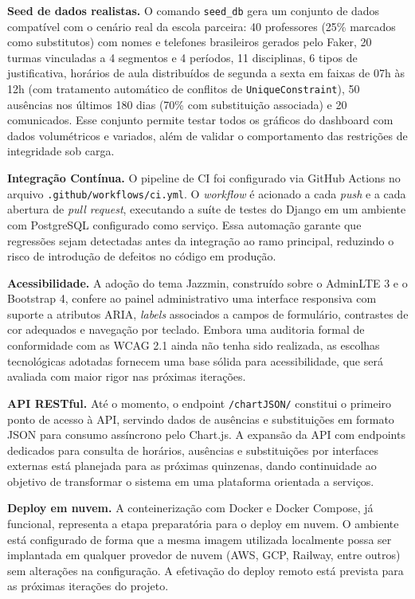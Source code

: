 \textbf{Seed de dados realistas.} O comando \texttt{seed\_db} gera um conjunto de dados compatível com o cenário real da escola parceira: 40 professores (25\% marcados como substitutos) com nomes e telefones brasileiros gerados pelo Faker, 20 turmas vinculadas a 4 segmentos e 4 períodos, 11 disciplinas, 6 tipos de justificativa, horários de aula distribuídos de segunda a sexta em faixas de 07h às 12h (com tratamento automático de conflitos de \texttt{UniqueConstraint}), 50 ausências nos últimos 180 dias (70\% com substituição associada) e 20 comunicados. Esse conjunto permite testar todos os gráficos do dashboard com dados volumétricos e variados, além de validar o comportamento das restrições de integridade sob carga.

\textbf{Integração Contínua.} O pipeline de CI foi configurado via GitHub Actions no arquivo \texttt{.github/workflows/ci.yml}. O \textit{workflow} é acionado a cada \textit{push} e a cada abertura de \textit{pull request}, executando a suíte de testes do Django em um ambiente com PostgreSQL configurado como serviço. Essa automação garante que regressões sejam detectadas antes da integração ao ramo principal, reduzindo o risco de introdução de defeitos no código em produção.

\textbf{Acessibilidade.} A adoção do tema Jazzmin, construído sobre o AdminLTE 3 e o Bootstrap 4, confere ao painel administrativo uma interface responsiva com suporte a atributos ARIA, \textit{labels} associados a campos de formulário, contrastes de cor adequados e navegação por teclado. Embora uma auditoria formal de conformidade com as WCAG 2.1 ainda não tenha sido realizada, as escolhas tecnológicas adotadas fornecem uma base sólida para acessibilidade, que será avaliada com maior rigor nas próximas iterações.

\textbf{API RESTful.} Até o momento, o endpoint \texttt{/chartJSON/} constitui o primeiro ponto de acesso à API, servindo dados de ausências e substituições em formato JSON para consumo assíncrono pelo Chart.js. A expansão da API com endpoints dedicados para consulta de horários, ausências e substituições por interfaces externas está planejada para as próximas quinzenas, dando continuidade ao objetivo de transformar o sistema em uma plataforma orientada a serviços.

\textbf{Deploy em nuvem.} A conteinerização com Docker e Docker Compose, já funcional, representa a etapa preparatória para o deploy em nuvem. O ambiente está configurado de forma que a mesma imagem utilizada localmente possa ser implantada em qualquer provedor de nuvem (AWS, GCP, Railway, entre outros) sem alterações na configuração. A efetivação do deploy remoto está prevista para as próximas iterações do projeto.


